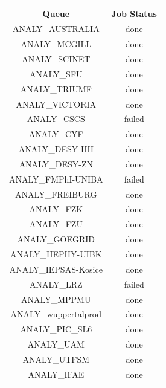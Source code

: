 \begin{longtable}{|c|c|}

	\hline

	Queue & Job Status\\\hline
	\endhead

	\hline
	\color{black}ANALY\_AUSTRALIA & \color{green}done \\
	\hline
	\color{black}ANALY\_MCGILL & \color{green}done \\
	\hline
	\color{black}ANALY\_SCINET & \color{green}done \\
	\hline
	\color{black}ANALY\_SFU & \color{green}done \\
	\hline
	\color{black}ANALY\_TRIUMF & \color{green}done \\
	\hline
	\color{black}ANALY\_VICTORIA & \color{green}done \\
	\hline
	\color{black}ANALY\_CSCS & \color{red}failed \\
	\hline
	\color{black}ANALY\_CYF & \color{green}done \\
	\hline
	\color{black}ANALY\_DESY-HH & \color{green}done \\
	\hline
	\color{black}ANALY\_DESY-ZN & \color{green}done \\
	\hline
	\color{black}ANALY\_FMPhI-UNIBA & \color{red}failed \\
	\hline
	\color{black}ANALY\_FREIBURG & \color{green}done \\
	\hline
	\color{black}ANALY\_FZK & \color{green}done \\
	\hline
	\color{black}ANALY\_FZU & \color{green}done \\
	\hline
	\color{black}ANALY\_GOEGRID & \color{green}done \\
	\hline
	\color{black}ANALY\_HEPHY-UIBK & \color{green}done \\
	\hline
	\color{black}ANALY\_IEPSAS-Kosice & \color{green}done \\
	\hline
	\color{black}ANALY\_LRZ & \color{red}failed \\
	\hline
	\color{black}ANALY\_MPPMU & \color{green}done \\
	\hline
	\hline
	\color{black}ANALY\_wuppertalprod & \color{green}done \\
	\hline
	\color{black}ANALY\_PIC\_SL6 & \color{green}done \\
	\hline
	\color{black}ANALY\_UAM & \color{green}done \\
	\hline
	\color{black}ANALY\_UTFSM & \color{green}done \\
	\hline
	\color{black}ANALY\_IFAE & \color{green}done \\

\end{longtable}
